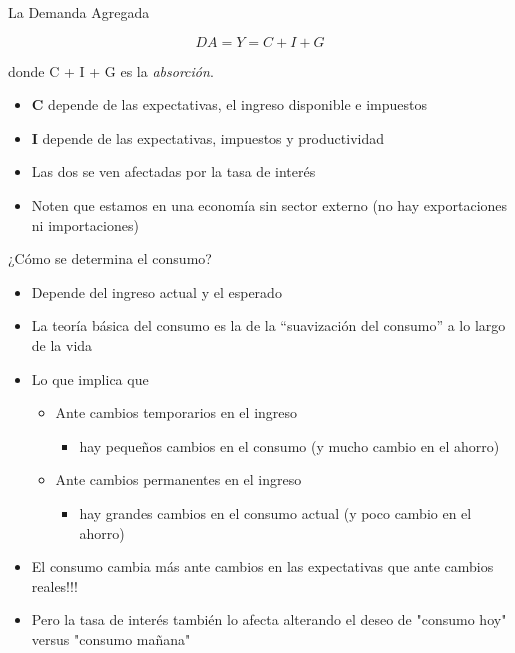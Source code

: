 \documentclass{beamer}
\begin{document}
\begin{frame}{La Demanda Agregada}
\begin{center}
   \begin{tcolorbox}[width=3in,
                  boxsep=0pt,
                  left=0pt,
                  right=0pt,
                  top=2pt,
                  colframe = blue!70!black,,
                    colback = blue!7!white,
                  ]%
        $$ DA=Y = C + I + G $$
    \end{tcolorbox} 
\end{center}
\vspace{1cm}
donde C + I + G es la \textit{absorción}.

\begin{itemize}
        \item \textbf{C} depende de las expectativas, el ingreso disponible e impuestos
        \item \textbf{I} depende de las expectativas, impuestos y productividad
        \item Las dos se ven afectadas por la tasa de interés
        \item Noten que estamos en una economía sin sector externo (no hay exportaciones ni importaciones)
\end{itemize}
\end{frame}

\begin{frame}{¿Cómo se determina el consumo?}
    \begin{itemize}
        \item Depende del ingreso actual y el esperado
        \item La teoría básica del consumo es la de la “suavización del consumo” a lo largo de la vida
        \item Lo que implica que 
            \begin{itemize}
            \item Ante cambios temporarios en el ingreso
                \begin{itemize}
                \item hay pequeños cambios en el consumo (y mucho cambio en el ahorro)
                \end{itemize}            
            \item Ante cambios permanentes en el ingreso
                \begin{itemize}
                \item hay grandes cambios en el consumo actual (y poco cambio en el ahorro)
                \end{itemize}
            \end{itemize}
        \item El consumo cambia más ante cambios en las expectativas que ante cambios reales!!!
        \item Pero la tasa de interés también lo afecta alterando el deseo de "consumo hoy" versus "consumo mañana"
    \end{itemize}
\end{frame}
\end{document}
